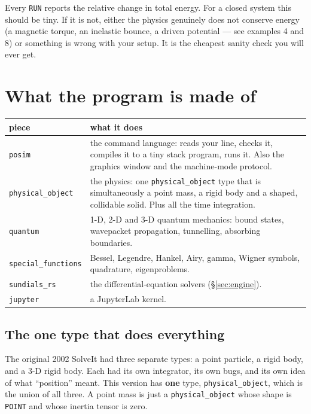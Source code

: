 \documentclass[11pt]{article}
\newcommand{\kw}[1]{\texttt{\uppercase{#1}}}
\newcommand{\code}[1]{\texttt{#1}}
\begin{document}
Every \kw{run} reports the relative change in total energy. For a closed
system this should be tiny. If it is not, either the physics genuinely
does not conserve energy (a magnetic torque, an inelastic bounce, a
driven potential --- see examples 4 and 8) or something is wrong with
your setup. It is the cheapest sanity check you will ever get.

\section{What the program is made of}

\begin{center}
\begin{tabular}{p{3.2cm}p{11.4cm}}
\textbf{piece} & \textbf{what it does}\\\hline
\code{posim} & the command language: reads your line, checks it,
compiles it to a tiny stack program, runs it. Also the graphics window
and the machine-mode protocol.\\
\code{physical\_object} & the physics: one \code{physical\_object} type
that is simultaneously a point mass, a rigid body and a shaped,
collidable solid. Plus all the time integration.\\
\code{quantum} & 1-D, 2-D and 3-D quantum mechanics: bound states,
wavepacket propagation, tunnelling, absorbing boundaries.\\
\code{special\_functions} & Bessel, Legendre, Hankel, Airy, gamma,
Wigner symbols, quadrature, eigenproblems.\\
\code{sundials\_rs} & the differential-equation solvers (\S\ref{sec:engine}).\\
\code{jupyter} & a JupyterLab kernel.\\
\end{tabular}
\end{center}

\subsection{The one type that does everything}

The original 2002 SolveIt had three separate types: a point particle, a
rigid body, and a 3-D rigid body. Each had its own integrator, its own
bugs, and its own idea of what ``position'' meant. This version has
\textbf{one} type, \code{physical\_object}, which is the union of all
three. A point mass is just a \code{physical\_object} whose shape is
\kw{point} and whose inertia tensor is zero.
\end{document}
